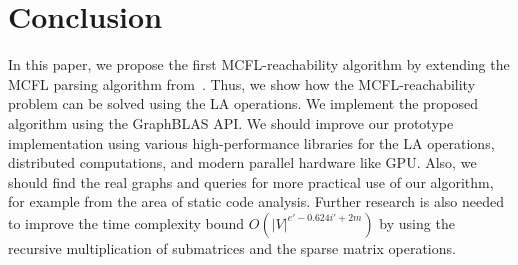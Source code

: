 \section{Conclusion}
In this paper, we propose the first MCFL-reachability algorithm by extending the MCFL parsing algorithm from~\cite{nakanishi1997efficient}. Thus, we show how the MCFL-reachability problem can be solved using the LA operations. We implement the proposed algorithm using the GraphBLAS API. We should improve our prototype implementation using various high-performance libraries for the LA operations, distributed computations, and modern parallel hardware like GPU. Also, we should find the real graphs and queries for more practical use of our algorithm, for example from the area of static code analysis. Further research is also needed to improve the time complexity bound $O(|V|^{e' - 0.624i' + 2m})$ by using the recursive multiplication of submatrices and the sparse matrix operations.